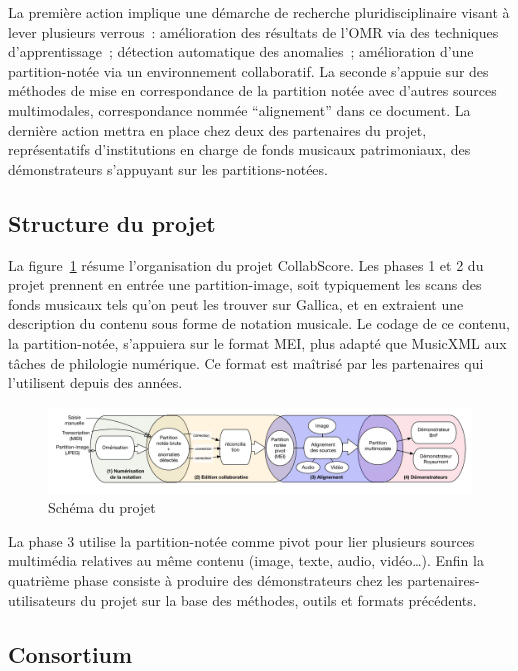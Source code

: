 \documentclass[11pt]{article}
\begin{document}
La première action implique une démarche de recherche pluridisciplinaire visant à lever plusieurs verrous : 
amélioration des résultats de l’OMR via des techniques d’apprentissage ; détection automatique des anomalies ; 
amélioration d’une partition-notée via un environnement collaboratif.  La seconde s’appuie sur des méthodes de 
mise en correspondance de la partition notée avec d’autres sources multimodales, 
correspondance nommée ``alignement'' dans ce document. 
La dernière action mettra en place chez deux des partenaires du projet, représentatifs d’institutions en 
charge de fonds musicaux patrimoniaux, des démonstrateurs s’appuyant sur les partitions-notées.  

\subsection{Structure du projet}

La figure~\ref{schema-projet} résume l'organisation du projet CollabScore.
Les phases 1 et 2 du projet prennent en entrée une partition-image, 
soit typiquement les scans des fonds musicaux tels qu’on peut les trouver 
sur Gallica, et en extraient une description du contenu sous forme de notation musicale. 
Le codage de ce contenu, la partition-notée, s’appuiera sur le format MEI, 
plus adapté que MusicXML aux tâches de philologie numérique. Ce format
 est maîtrisé par les partenaires qui l’utilisent depuis des années. 
 
  \begin{figure}[htb]
  \begin{center}
   \includegraphics[width=\textwidth]{schema_projet.pdf}
    \caption{Schéma du projet}
    \label{schema-projet}
    \end{center}
  \end{figure}

 
 La phase 3 utilise la partition-notée comme pivot pour lier plusieurs sources 
 multimédia relatives au même contenu (image, texte, audio, vidéo…). 
 Enfin la quatrième phase consiste à produire des démonstrateurs  
 chez les partenaires-utilisateurs du projet sur la base des méthodes, outils et formats précédents.

\subsection{Consortium}
\end{document}
